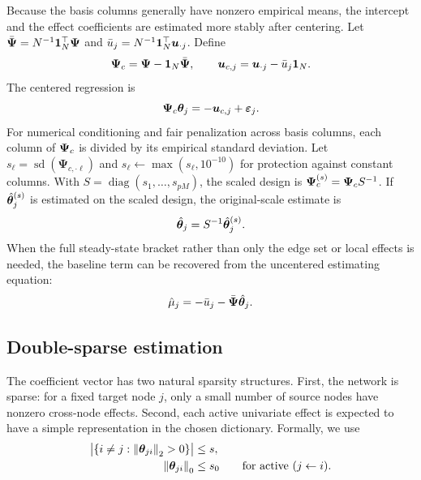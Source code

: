 Because the basis columns generally have nonzero empirical means, the intercept
and the effect coefficients are estimated more stably after centering.  Let
$\bar{\bm{\Psi}}=N^{-1}\mathbf{1}_N^\top\bm{\Psi}$ and
$\bar u_j=N^{-1}\mathbf{1}_N^\top \bm{u}_{\cdot j}$.  Define
\begin{equation}
  \bm{\Psi}_{c} = \bm{\Psi}-\mathbf{1}_N\bar{\bm{\Psi}},
  \qquad
  \bm{u}_{c,j} = \bm{u}_{\cdot j}-\bar u_j\mathbf{1}_N.
  \label{eq:center}
\end{equation}
The centered regression is
\begin{equation}
  \bm{\Psi}_{c}\bm{\theta}_j
  =
  -\bm{u}_{c,j} + \bm{\varepsilon}_j.
  \label{eq:centered-linear}
\end{equation}
For numerical conditioning and fair penalization across basis columns, each
column of $\bm{\Psi}_{c}$ is divided by its empirical standard deviation.  Let
$s_\ell=\operatorname{sd}(\bm{\Psi}_{c,\cdot\ell})$ and
$s_\ell\leftarrow \max(s_\ell,10^{-10})$ for protection against constant
columns.  With $S=\operatorname{diag}(s_1,\ldots,s_{pM})$, the scaled design is
$\bm{\Psi}_{c}^{(s)}=\bm{\Psi}_{c} S^{-1}$.  If $\hat{\bm{\theta}}_j^{(s)}$ is estimated on the
scaled design, the original-scale estimate is
\begin{equation}
  \hat{\bm{\theta}}_j = S^{-1}\hat{\bm{\theta}}_j^{(s)}.
  \label{eq:unscale}
\end{equation}
When the full steady-state bracket rather than only the edge set or local
effects is needed, the baseline term can be recovered from the uncentered
estimating equation:
\begin{equation}
  \hat\mu_j = -\bar u_j - \bar{\bm{\Psi}}\hat{\bm{\theta}}_j.
  \label{eq:intercept}
\end{equation}

\subsection{Double-sparse estimation}
\label{sec:method:adsiht}

The coefficient vector has two natural sparsity structures.  First, the network
is sparse: for a fixed target node $j$, only a small number of source nodes have
nonzero cross-node effects.  Second, each active univariate effect is expected to
have a simple representation in the chosen dictionary.  Formally, we use
\begin{align}
  \left|\{i\neq j:\left\lVert\bm{\theta}_{ji}\right\rVert_2>0\}\right| &\le s,
  \label{eq:sparse-group}\\
  \left\lVert\bm{\theta}_{ji}\right\rVert_0 &\le s_0
  \qquad\text{for active } (j\leftarrow i).
  \label{eq:sparse-within}
\end{align}

